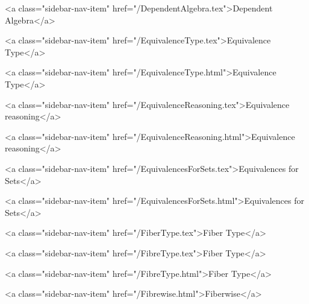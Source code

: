       
        
          <a class="sidebar-nav-item" href="/DependentAlgebra.tex">Dependent Algebra</a>
        
      
    
      
        
          <a class="sidebar-nav-item" href="/EquivalenceType.tex">Equivalence Type</a>
        
      
    
      
        
          <a class="sidebar-nav-item" href="/EquivalenceType.html">Equivalence Type</a>
        
      
    
      
        
          <a class="sidebar-nav-item" href="/EquivalenceReasoning.tex">Equivalence reasoning</a>
        
      
    
      
        
          <a class="sidebar-nav-item" href="/EquivalenceReasoning.html">Equivalence reasoning</a>
        
      
    
      
        
          <a class="sidebar-nav-item" href="/EquivalencesForSets.tex">Equivalences for Sets</a>
        
      
    
      
        
          <a class="sidebar-nav-item" href="/EquivalencesForSets.html">Equivalences for Sets</a>
        
      
    
      
        
          <a class="sidebar-nav-item" href="/FiberType.tex">Fiber Type</a>
        
      
    
      
        
          <a class="sidebar-nav-item" href="/FibreType.tex">Fiber Type</a>
        
      
    
      
        
          <a class="sidebar-nav-item" href="/FibreType.html">Fiber Type</a>
        
      
    
      
        
          <a class="sidebar-nav-item" href="/Fibrewise.html">Fiberwise</a>
        
